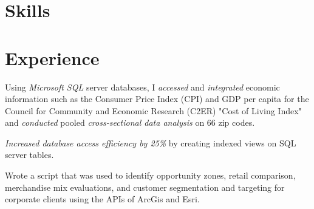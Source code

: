 \documentclass[]{aahil-resume-openfont}
\begin{document}
%
%
\lastupdated

%
%

%
%

\begin{minipage}[t]{0.60\textwidth} 

\section{Skills}
\sectionsep

\section{Experience}
\vspace{\topsep} %
\begin{tightemize}
\item Using \textit{Microsoft SQL} server databases, I \textit{accessed} and \textit{integrated} economic information such as the Consumer Price Index (CPI) and GDP per capita for the Council for Community and Economic Research (C2ER) "Cost of Living Index" and \textit{conducted} pooled \textit{cross-sectional data analysis} on 66 zip codes.
\item \textit{Increased database access efficiency by 25\%} by creating indexed views on SQL server tables.
\item Wrote a script that was used to identify opportunity zones, retail comparison, merchandise mix evaluations, and customer segmentation and targeting for corporate clients using the APIs of ArcGis and Esri.
\end{tightemize}
\sectionsep


\end{minipage}
\end{document}
